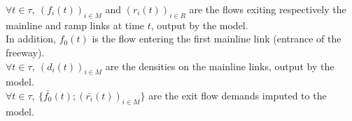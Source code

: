 $\forall t \in \tau,\ (f_{i}(t))_{i\in{M}}$ and $(r_{i}(t))_{i\in{R}}$ are the flows exiting respectively the mainline and ramp links at time $t$, output by the model.\\
In addition, $f_{0}(t)$ is the flow entering the first mainline link (entrance of the freeway).\\
$\forall t \in \tau,\ (d_{i}(t))_{i\in{M}} $ are the densities on the mainline links, output by the model.\\
$\forall t \in \tau,\ \big\{\bar{f_{0}}(t) ; (\bar{r_{i}}(t))_{i\in{M}} \big\} $ are the exit flow demands imputed to the model.\\